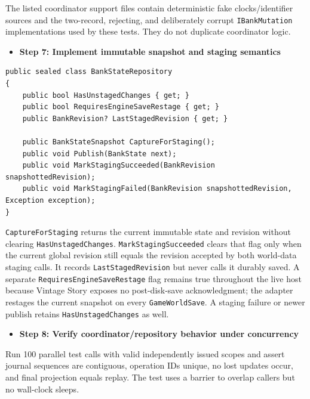 \documentclass[
  10pt,
  letterpaper,
]{article}
\newcommand{\passthrough}[1]{#1}
\providecommand{\tightlist}{%
  \setlength{\itemsep}{0pt}\setlength{\parskip}{0pt}}
\begin{document}
The listed coordinator support files contain deterministic fake
clocks/identifier sources and the two-record, rejecting, and
deliberately corrupt \passthrough{\lstinline!IBankMutation!}
implementations used by these tests. They do not duplicate coordinator
logic.

\begin{itemize}
\tightlist
\item[$\square$]
  \textbf{Step 7: Implement immutable snapshot and staging semantics}
\end{itemize}

\begin{lstlisting}
public sealed class BankStateRepository
{
    public bool HasUnstagedChanges { get; }
    public bool RequiresEngineSaveRestage { get; }
    public BankRevision? LastStagedRevision { get; }

    public BankStateSnapshot CaptureForStaging();
    public void Publish(BankState next);
    public void MarkStagingSucceeded(BankRevision snapshottedRevision);
    public void MarkStagingFailed(BankRevision snapshottedRevision, Exception exception);
}
\end{lstlisting}

\passthrough{\lstinline!CaptureForStaging!} returns the current
immutable state and revision without clearing
\passthrough{\lstinline!HasUnstagedChanges!}.
\passthrough{\lstinline!MarkStagingSucceeded!} clears that flag only
when the current global revision still equals the revision accepted by
both world-data staging calls. It records
\passthrough{\lstinline!LastStagedRevision!} but never calls it durably
saved. A separate \texttt{RequiresEngineSaveRestage} flag remains true
throughout the live host because Vintage Story exposes no post-disk-save
acknowledgment; the adapter restages the current snapshot on every
\passthrough{\lstinline!GameWorldSave!}. A staging failure or newer
publish retains \passthrough{\lstinline!HasUnstagedChanges!} as well.

\begin{itemize}
\tightlist
\item[$\square$]
  \textbf{Step 8: Verify coordinator/repository behavior under
  concurrency}
\end{itemize}

Run 100 parallel test calls with valid independently issued scopes and
assert journal sequences are contiguous, operation IDs unique, no lost
updates occur, and final projection equals replay. The test uses a
barrier to overlap callers but no wall-clock sleeps.
\end{document}
